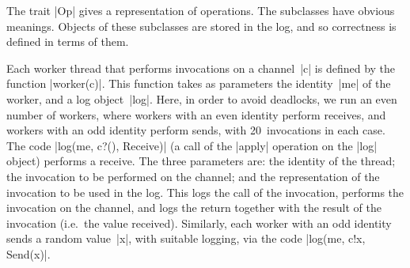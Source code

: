 








The trait |Op| gives a representation of operations.  The subclasses have
obvious meanings.  Objects of these subclasses are stored in the log, and so
correctness is defined in terms of them.

Each worker thread that performs invocations on a channel~|c| is defined by
the function |worker(c)|.  This function takes as parameters the identity~|me|
of the worker, and a log object~|log|.  Here, in order to avoid deadlocks, we
run an even number of workers, where workers with an even identity perform
receives, and workers with an odd identity perform sends, with 20~invocations
in each case.  The code |log(me, c?(), Receive)| (a call of the |apply|
operation on the |log| object) performs a receive.  The three parameters are:
the identity of the thread; the invocation to be performed on the channel; and
the representation of the invocation to be used in the log.  This logs the
call of the invocation, performs the invocation on the channel, and logs the
return together with the result of the invocation (i.e.~the value received).
Similarly, each worker with an odd identity sends a random value~|x|, with
suitable logging, via the code |log(me, c!x, Send(x)|.

